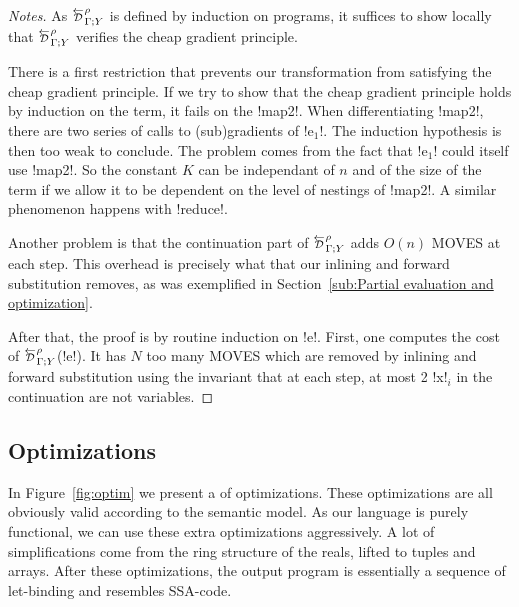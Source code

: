 \begin{proof}[Notes]
    As $\directD{\rho}{\Gamma}{Y}$ is defined by induction on programs, it suffices to show locally 
that $\directD{\rho}{\Gamma}{Y}$ verifies the cheap gradient principle. 

There is a first restriction that prevents our transformation from satisfying the cheap gradient principle.
If we try to show that the cheap gradient principle holds by induction on the term, it fails on the !map2!.
When differentiating !map2!, there are two series of calls to (sub)gradients of !e$_1$!. 
The induction hypothesis is then too weak to conclude. 
The problem comes from the fact that !e$_1$! could itself use !map2!. 
So the constant $K$ can be independant of $n$ and of 
the size of the term if we allow it to be dependent on the level of nestings of !map2!.
A similar phenomenon happens with !reduce!.

Another problem is that the continuation part of $\directD{\rho}{\Gamma}{Y}$ adds $O(n)$ MOVES at each step.
This overhead is precisely what that our inlining and forward substitution removes, 
as was exemplified in Section~\ref{sub:Partial evaluation and optimization}. 

After that, the proof is by routine induction on !e!. 
First, one computes the cost of $\directD{\rho}{\Gamma}{Y}$(!e!).
It has $N$ too many MOVES which are removed by inlining and forward substitution using the invariant that at each step, 
at most 2 !x!$_i$ in the continuation are not variables.
\end{proof}

\subsection{Optimizations} %
\label{sub:Optimizations}

In Figure~\ref{fig:optim} we present a of optimizations. 
These optimizations are all obviously valid according to the semantic model. 
As our language is purely functional, we can use these extra optimizations aggressively. 
A lot of simplifications come from the ring structure of the reals, lifted to tuples and arrays.
After these optimizations, the output program is essentially a sequence of let-binding
and resembles SSA-code.

